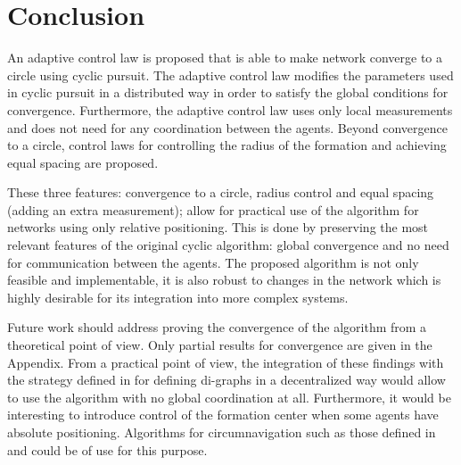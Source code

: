 \section{Conclusion}

An adaptive control law is proposed that is able to make network converge to a circle using cyclic pursuit. The adaptive control law modifies the parameters used in cyclic pursuit in a distributed way in order to satisfy the global conditions for convergence. Furthermore, the adaptive control law uses only local measurements and does not need for any coordination between the agents. Beyond convergence to a circle, control laws for controlling the radius of the formation and achieving equal spacing are proposed. 

These three features: convergence to a circle, radius control and equal spacing (adding an extra measurement); allow for practical use of the algorithm for networks using only relative positioning. This is done by preserving the most relevant features of the original cyclic algorithm: global convergence and no need for communication between the agents. The proposed algorithm is not only feasible and implementable, it is also robust to changes in the network which is highly desirable for its integration into more complex systems.

Future work should address proving the convergence of the algorithm from a theoretical point of view. Only partial results for convergence are given in the Appendix. From a practical point of view, the integration of these findings with the strategy defined in \cite{pavone2007decentralized} for defining di-graphs in a decentralized way would allow to use the algorithm with no global coordination at all. Furthermore, it would be interesting to introduce control of the formation center when some agents have absolute positioning. Algorithms for circumnavigation such as those defined in \cite{deghat2010target} and \cite{deghat2014localization} could be of use for this purpose.
